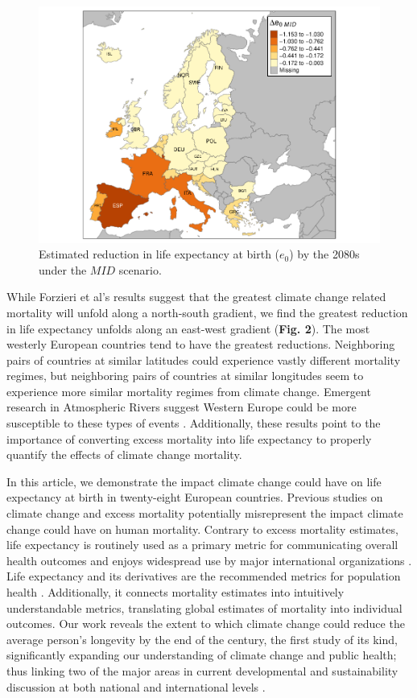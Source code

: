 \documentclass[12pt,]{article}
\makeatletter
\def\maxwidth{\ifdim\Gin@nat@width>\linewidth\linewidth
\else\Gin@nat@width\fi}
\let\Oldincludegraphics\includegraphics
\renewcommand{\includegraphics}[1]{\Oldincludegraphics[width=\maxwidth]{#1}}
\makeatother
\begin{document}
\begin{figure}
\centering
\includegraphics{MS-cclifeexpec_files/figure-latex/unnamed-chunk-3-1.pdf}
\caption{Estimated reduction in life expectancy at birth (\(e_0\)) by
the 2080s under the \(MID\) scenario.}
\end{figure}

While Forzieri et al's \citep{forzieri2017increasing} results suggest
that the greatest climate change related mortality will unfold along a
north-south gradient, we find the greatest reduction in life expectancy
unfolds along an east-west gradient (\textbf{Fig. 2}). The most westerly
European countries tend to have the greatest reductions. Neighboring
pairs of countries at similar latitudes could experience vastly
different mortality regimes, but neighboring pairs of countries at
similar longitudes seem to experience more similar mortality regimes
from climate change. Emergent research in Atmospheric Rivers suggest
Western Europe could be more susceptible to these types of events
\citep{ramos2015daily}. Additionally, these results point to the
importance of converting excess mortality into life expectancy to
properly quantify the effects of climate change mortality.

In this article, we demonstrate the impact climate change could have on
life expectancy at birth in twenty-eight European countries. Previous
studies on climate change and excess mortality potentially misrepresent
the impact climate change could have on human mortality. Contrary to
excess mortality estimates, life expectancy is routinely used as a
primary metric for communicating overall health outcomes and enjoys
widespread use by major international organizations
\citep{world2015world, marmot2012building, salomon2012healthy}. Life
expectancy and its derivatives are the recommended metrics for
population health \citep{parrish2010peer}. Additionally, it connects
mortality estimates into intuitively understandable metrics, translating
global estimates of mortality into individual outcomes. Our work reveals
the extent to which climate change could reduce the average person's
longevity by the end of the century, the first study of its kind,
significantly expanding our understanding of climate change and public
health; thus linking two of the major areas in current developmental and
sustainability discussion at both national and international levels
\citep{abel2016meeting}.
\end{document}
